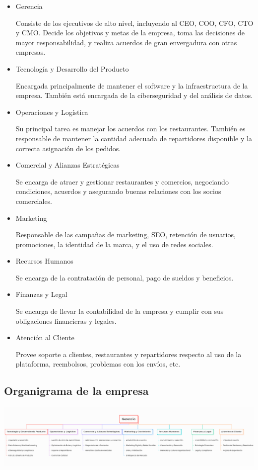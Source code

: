 \begin{itemize}
    \item Gerencia
    
    Consiste de los ejecutivos de alto nivel, incluyendo al CEO, COO, CFO, CTO y CMO. Decide los objetivos y metas de la empresa, toma las decisiones de mayor responsabilidad, y realiza acuerdos de gran envergadura con otras empresas.

    \item Tecnología y Desarrollo del Producto
    
    Encargada principalmente de mantener el software y la infraestructura de la empresa. También está encargada de la ciberseguridad y del análisis de datos.

    \item Operaciones y Logística
    
    Su principal tarea es manejar los acuerdos con los restaurantes. También es responsable de mantener la cantidad adecuada de repartidores disponible y la correcta asignación de los pedidos.

    \item Comercial y Alianzas Estratégicas
    
    Se encarga de atraer y gestionar restaurantes y comercios, negociando condiciones, acuerdos y asegurando buenas relaciones con los socios comerciales.

    \item Marketing
    
    Responsable de las campañas de marketing, SEO, retención de usuarios, promociones, la identidad de la marca, y el uso de redes sociales.

    \item Recursos Humanos
    
    Se encarga de la contratación de personal, pago de sueldos y beneficios.

    \item Finanzas y Legal
    
    Se encarga de llevar la contabilidad de la empresa y cumplir con sus obligaciones financieras y legales.

    \item Atención al Cliente
    
    Provee soporte a clientes, restaurantes y repartidores respecto al uso de la plataforma, reembolsos, problemas con los envíos, etc.
\end{itemize}

\subsection{Organigrama de la empresa}
\includegraphics[scale=0.27]{./img/organigrama.png}
